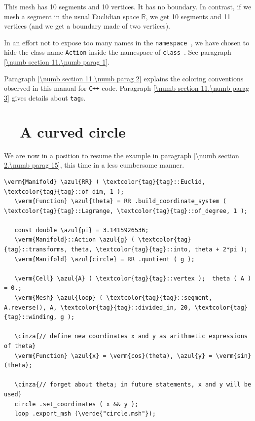 This mesh has 10 segments and 10 vertices. It has no boundary.
In contrast, if we mesh a segment in the usual Euclidian space $ \mathbb{R} $,
we get 10 segments and 11 vertices (and we get a boundary made of two vertices).

In an effort not to expose too many names in the {\small\tt namespace },
we have chosen to hide the class name {\small\tt Action} inside the namespace of
{\small\tt class }.
See paragraph \ref{\numb section 11.\numb parag 1}.

Paragraph \ref{\numb section 11.\numb parag 2} explains the coloring conventions observed
in this manual for {\tt C++} code.
Paragraph \ref{\numb section 11.\numb parag 3} gives details about
{\small\tt\textcolor{tag}{tag}}s.


\section{~~A curved circle}\label{\numb section 7.\numb parag 2}

We are now in a position to resume the example in paragraph \ref{\numb section 2.\numb parag 15},
this time in a less cumbersome manner.

\begin{Verbatim}[commandchars=\\\{\},formatcom=\small\tt,frame=single,
   label=parag-\ref{\numb section 7.\numb parag 2}.cpp,rulecolor=\color{coment},
   baselinestretch=0.94,framesep=2mm                                            ]
   \verm{Manifold} \azul{RR} ( \textcolor{tag}{tag}::Euclid, \textcolor{tag}{tag}::of_dim, 1 );
   \verm{Function} \azul{theta} = RR .build_coordinate_system ( \textcolor{tag}{tag}::Lagrange, \textcolor{tag}{tag}::of_degree, 1 );

   const double \azul{pi} = 3.1415926536;
   \verm{Manifold}::Action \azul{g} ( \textcolor{tag}{tag}::transforms, theta, \textcolor{tag}{tag}::into, theta + 2*pi );
   \verm{Manifold} \azul{circle} = RR .quotient ( g );

   \verm{Cell} \azul{A} ( \textcolor{tag}{tag}::vertex );  theta ( A ) = 0.;
   \verm{Mesh} \azul{loop} ( \textcolor{tag}{tag}::segment, A.reverse(), A, \textcolor{tag}{tag}::divided_in, 20, \textcolor{tag}{tag}::winding, g );

   \cinza{// define new coordinates x and y as arithmetic expressions of theta}
   \verm{Function} \azul{x} = \verm{cos}(theta), \azul{y} = \verm{sin}(theta);

   \cinza{// forget about theta; in future statements, x and y will be used}
   circle .set_coordinates ( x && y );
   loop .export_msh (\verde{"circle.msh"});
\end{Verbatim}


